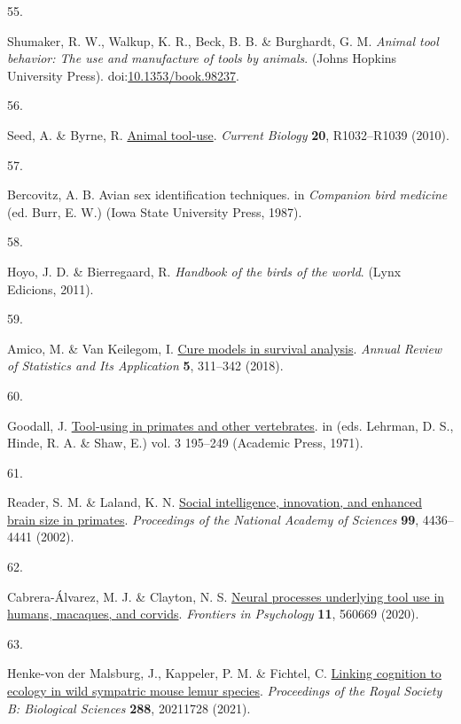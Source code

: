 \documentclass[
  man,floatsintext]{apa6}
\newlength{\cslhangindent}
\newlength{\csllabelwidth}
\newlength{\cslentryspacingunit} %
\newenvironment{CSLReferences}[2] %
 {%
  \setlength{\parindent}{0pt}
  \ifodd #1
  \let\oldpar\par
  \def\par{\hangindent=\cslhangindent\oldpar}
  \fi
  \setlength{\parskip}{#2\cslentryspacingunit}
 }%
 {}
\newcommand{\CSLLeftMargin}[1]{\parbox[t]{\csllabelwidth}{#1}}
\newcommand{\CSLRightInline}[1]{\parbox[t]{\linewidth - \csllabelwidth}{#1}\break}
\begin{document}
\begin{CSLReferences}{0}{0}
\leavevmode{}%
\CSLLeftMargin{55. }%
\CSLRightInline{Shumaker, R. W., Walkup, K. R., Beck, B. B. \& Burghardt, G. M. \emph{Animal tool behavior: The use and manufacture of tools by animals}. (Johns Hopkins University Press). doi:\href{https://doi.org/10.1353/book.98237}{10.1353/book.98237}.}

\leavevmode{}%
\CSLLeftMargin{56. }%
\CSLRightInline{Seed, A. \& Byrne, R. \href{https://doi.org/10.1016/j.cub.2010.09.042}{Animal tool-use}. \emph{Current Biology} \textbf{20}, R1032--R1039 (2010).}

\leavevmode{}%
\CSLLeftMargin{57. }%
\CSLRightInline{Bercovitz, A. B. Avian sex identification techniques. in \emph{Companion bird medicine} (ed. Burr, E. W.) (Iowa State University Press, 1987).}

\leavevmode{}%
\CSLLeftMargin{58. }%
\CSLRightInline{Hoyo, J. D. \& Bierregaard, R. \emph{Handbook of the birds of the world}. (Lynx Edicions, 2011).}

\leavevmode{}%
\CSLLeftMargin{59. }%
\CSLRightInline{Amico, M. \& Van Keilegom, I. \href{https://doi.org/10.1146/annurev-statistics-031017-100101}{Cure models in survival analysis}. \emph{Annual Review of Statistics and Its Application} \textbf{5}, 311--342 (2018).}

\leavevmode{}%
\CSLLeftMargin{60. }%
\CSLRightInline{Goodall, J. \href{https://doi.org/10.1016/S0065-3454(08)60157-6}{Tool-using in primates and other vertebrates}. in (eds. Lehrman, D. S., Hinde, R. A. \& Shaw, E.) vol. 3 195--249 (Academic Press, 1971).}

\leavevmode{}%
\CSLLeftMargin{61. }%
\CSLRightInline{Reader, S. M. \& Laland, K. N. \href{https://doi.org/10.1073/pnas.062041299}{Social intelligence, innovation, and enhanced brain size in primates}. \emph{Proceedings of the National Academy of Sciences} \textbf{99}, 4436--4441 (2002).}

\leavevmode{}%
\CSLLeftMargin{62. }%
\CSLRightInline{Cabrera-Álvarez, M. J. \& Clayton, N. S. \href{https://doi.org/10.3389/fpsyg.2020.560669}{Neural processes underlying tool use in humans, macaques, and corvids}. \emph{Frontiers in Psychology} \textbf{11}, 560669 (2020).}

\leavevmode{}%
\CSLLeftMargin{63. }%
\CSLRightInline{Henke-von der Malsburg, J., Kappeler, P. M. \& Fichtel, C. \href{https://doi.org/10.1098/rspb.2021.1728}{Linking cognition to ecology in wild sympatric mouse lemur species}. \emph{Proceedings of the Royal Society B: Biological Sciences} \textbf{288}, 20211728 (2021).}


\end{CSLReferences}
\end{document}
